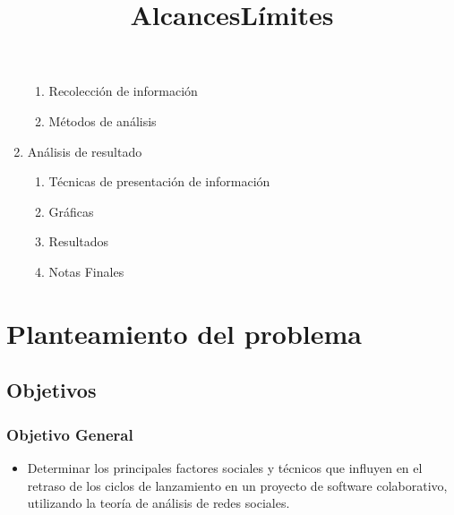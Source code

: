 \documentclass[12pt]{report}
\begin{document}
\begin{enumerate}
\begin{enumerate}
  \item Recolección de información
  \item Métodos de análisis
  \end{enumerate}
\item Análisis de resultado
  \begin{enumerate}
  \item Técnicas de presentación de información
  \item Gráficas
  \item Resultados
  \item Notas Finales
  \end{enumerate}
\end{enumerate}

\chapter*{Planteamiento del problema}
\title{Alcances} 

\title{Límites}


\section*{Objetivos}  %
\subsection*{Objetivo General}
\begin{itemize}
\item  Determinar los  principales  factores sociales  y técnicos  que
influyen en el retraso de los  ciclos de lanzamiento en un proyecto de
software  colaborativo,  utilizando la  teoría  de  análisis de  redes
sociales.
\end{itemize}
\end{document}
